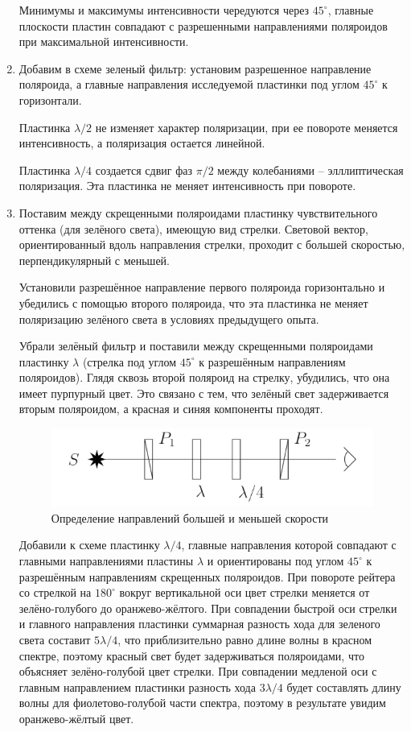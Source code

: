 \documentclass[a4paper, 12pt]{article}%
\begin{document}
\begin{enumerate}
Минимумы и максимумы интенсивности чередуются через $45^{\circ}$, главные плоскости пластин совпадают с разрешенными направлениями поляроидов при максимальной интенсивности.

\item Добавим в схеме зеленый фильтр: установим разрешенное направление поляроида, а главные направления исследуемой пластинки под углом $45^{\circ}$ к горизонтали.

Пластинка $\lambda/ 2$ не изменяет характер поляризации, при ее повороте меняется интенсивность, а поляризация остается линейной.

Пластинка $\lambda/ 4$ создается сдвиг фаз $\pi / 2$ между колебаниями -- элллиптическая поляризация. Эта пластинка не меняет интенсивность при повороте.

\item Поставим между скрещенными поляроидами пластинку чувствительного оттенка (для зелёного света), имеющую вид стрелки. Световой вектор, ориентированный вдоль направления стрелки, проходит с большей скоростью, перпендикулярный с меньшей.
		
Установили разрешённое направление первого поляроида горизонтально и убедились с помощью второго поляроида, что эта пластинка не меняет поляризацию зелёного света в условиях предыдущего опыта.
		
Убрали зелёный фильтр и поставили между скрещенными поляроидами пластинку $\lambda$ (стрелка под углом $45^\circ$ к разрешённым направлениям поляроидов). Глядя сквозь второй поляроид на стрелку, убудились, что она имеет пурпурный цвет. Это связано с тем, что зелёный свет задерживается вторым поляроидом, а красная и синяя компоненты проходят.

\begin{figure}[h!]
\centering
\includegraphics[scale=1]{images/speed.png}
\caption{Определение направлений большей и меньшей скорости}
\label{speed}
\end{figure}
		
Добавили к схеме пластинку $\lambda/4$, главные направления которой совпадают с главными направлениями пластины $\lambda$ и ориентированы под углом $45^\circ$ к разрешённым направлениям скрещенных поляроидов. При повороте рейтера со стрелкой на $180^\circ$ вокруг вертикальной оси цвет стрелки меняется от зелёно-голубого до оранжево-жёлтого. При совпадении быстрой оси стрелки и главного направления пластинки суммарная разность хода для зеленого света составит $5\lambda/4$, что приблизительно равно длине волны в красном спектре, поэтому красный свет будет задерживаться поляроидами, что объясняет зелёно-голубой цвет стрелки. При совпадении медленой оси с главным направлением пластинки разность хода $3\lambda /4$ будет составлять длину волны для фиолетово-голубой части спектра, поэтому в результате увидим оранжево-жёлтый цвет.
		

\end{enumerate}
\end{document}
